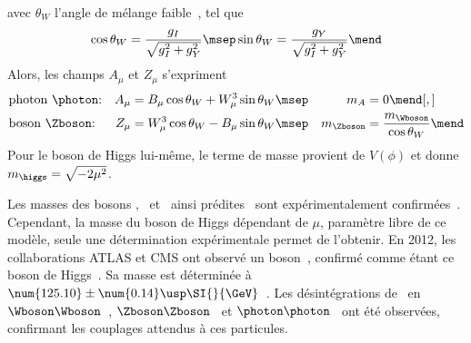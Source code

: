 avec $\theta_W$ l'angle de mélange faible~\cite{GLASHOW1961579}, tel que
\begin{equation}
\cos\theta_W = \frac{g_I}{\sqrt{g_I^2 + g_Y^2}}
\msep
\sin\theta_W = \frac{g_Y}{\sqrt{g_I^2 + g_Y^2}}
\mend
\label{eq-chapter-MS-MSSM-section-formalisme-subsec-Higgs_mechanism-thetaW}
\end{equation}
Alors, les champs $A_\mu$ et $Z_\mu$ s'expriment
\begin{align}
&
\text{photon \photon:}
&
A_\mu &= B_\mu \cos\theta_W + W_\mu^3 \sin\theta_W
\msep&
m_A &= 0
\mend[,]
\\
&
\text{boson \Zboson:}
&
Z_\mu &= W_\mu^3 \cos\theta_W - B_\mu \sin\theta_W
\msep&
m_{\Zboson} &= \frac{m_{\Wboson}}{\cos\theta_W}
\mend
\end{align}
Pour le boson de Higgs lui-même, le terme de masse provient de $V(\phi)$ et donne $m_{\higgs} = \sqrt{-2\mu^2}$.
\par Les masses des bosons \Wbosonpm, \photon\ et \Zboson\ ainsi prédites~\cite{Weinberg_leptons_model} sont expérimentalement confirmées~\cite{PDG_booklet_2020,Wboson_discovery1,Wboson_discovery2,Wboson_discovery3,Zboson_discovery1,Zboson_discovery2}.
Cependant, la masse du boson de Higgs dépendant de $\mu$, paramètre libre de ce modèle, seule une détermination expérimentale permet de l'obtenir. En 2012, les collaborations ATLAS et CMS ont observé un boson~\cite{ATLAS_Higgs_discovery,CMS_Higgs_discovery,CMS_Higgs_discovery_2013}, confirmé comme étant ce boson de Higgs~\cite{ATLAS-CMS-Higgs_combined_1,ATLAS-CMS-Higgs_combined_2}. Sa masse est déterminée à $\num{125.10}\pm\num{0.14}\usp\SI{}{\GeV}$~\cite{PDG_booklet_2020,2020135425,PhysRevD.99.112003}.
Les désintégrations de \higgs\ en
$\Wboson\Wboson$~\cite{higgs_WW},
$\Zboson\Zboson$~\cite{CMS-PAS-HIG-13-002,PhysRevD.89.092007}
et
$\photon\photon$~\cite{higgs_diphoton}
ont été observées, confirmant les couplages attendus à ces particules.
